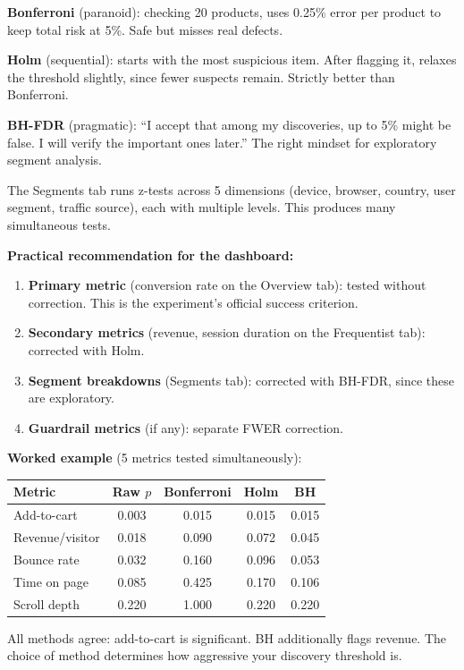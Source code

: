 \documentclass[11pt,a4paper]{article}
\begin{document}
\begin{intuition}
\textbf{Bonferroni} (paranoid): checking 20 products, uses 0.25\% error per product to keep total risk at 5\%. Safe but misses real defects.

\textbf{Holm} (sequential): starts with the most suspicious item. After flagging it, relaxes the threshold slightly, since fewer suspects remain. Strictly better than Bonferroni.

\textbf{BH-FDR} (pragmatic): ``I accept that among my discoveries, up to 5\% might be false. I will verify the important ones later.'' The right mindset for exploratory segment analysis.
\end{intuition}

\vspace{8pt}

\begin{application}
The Segments tab runs z-tests across 5 dimensions (device, browser, country, user segment, traffic source), each with multiple levels. This produces many simultaneous tests.

\medskip
\textbf{Practical recommendation for the dashboard:}
\begin{enumerate}[nosep]
  \item \textbf{Primary metric} (conversion rate on the Overview tab): tested without correction. This is the experiment's official success criterion.
  \item \textbf{Secondary metrics} (revenue, session duration on the Frequentist tab): corrected with Holm.
  \item \textbf{Segment breakdowns} (Segments tab): corrected with BH-FDR, since these are exploratory.
  \item \textbf{Guardrail metrics} (if any): separate FWER correction.
\end{enumerate}

\medskip
\textbf{Worked example} (5 metrics tested simultaneously):

\medskip
\begin{tabular}{@{}lcccc@{}}
\toprule
Metric & Raw $p$ & Bonferroni & Holm & BH \\
\midrule
Add-to-cart & 0.003 & 0.015 & 0.015 & 0.015 \\
Revenue/visitor & 0.018 & 0.090 & 0.072 & 0.045 \\
Bounce rate & 0.032 & 0.160 & 0.096 & 0.053 \\
Time on page & 0.085 & 0.425 & 0.170 & 0.106 \\
Scroll depth & 0.220 & 1.000 & 0.220 & 0.220 \\
\bottomrule
\end{tabular}

\medskip
All methods agree: add-to-cart is significant. BH additionally flags revenue. The choice of method determines how aggressive your discovery threshold is.
\end{application}
\end{document}
